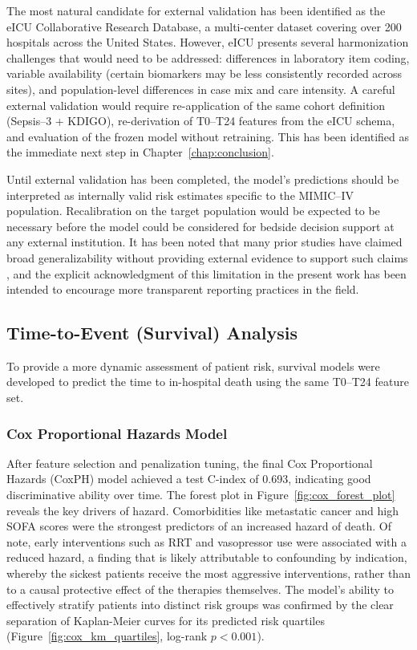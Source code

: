 The most natural candidate for external validation has been identified as the eICU Collaborative Research Database, a multi-center dataset covering over 200 hospitals across the United States. However, eICU presents several harmonization challenges that would need to be addressed: differences in laboratory item coding, variable availability (certain biomarkers may be less consistently recorded across sites), and population-level differences in case mix and care intensity. A careful external validation would require re-application of the same cohort definition (Sepsis--3 + KDIGO), re-derivation of T0--T24 features from the eICU schema, and evaluation of the frozen model without retraining. This has been identified as the immediate next step in Chapter~\ref{chap:conclusion}.

Until external validation has been completed, the model's predictions should be interpreted as internally valid risk estimates specific to the MIMIC--IV population. Recalibration on the target population would be expected to be necessary before the model could be considered for bedside decision support at any external institution. It has been noted that many prior studies have claimed broad generalizability without providing external evidence to support such claims \citep{Chen_2025}, and the explicit acknowledgment of this limitation in the present work has been intended to encourage more transparent reporting practices in the field.

\subsection{Time-to-Event (Survival) Analysis}
To provide a more dynamic assessment of patient risk, survival models were developed to predict the time to in-hospital death using the same T0--T24 feature set.

\subsubsection{Cox Proportional Hazards Model}
After feature selection and penalization tuning, the final Cox Proportional Hazards (CoxPH) model achieved a test C-index of 0.693, indicating good discriminative ability over time. The forest plot in Figure~\ref{fig:cox_forest_plot} reveals the key drivers of hazard. Comorbidities like metastatic cancer and high SOFA scores were the strongest predictors of an increased hazard of death. Of note, early interventions such as RRT and vasopressor use were associated with a reduced hazard, a finding that is likely attributable to confounding by indication, whereby the sickest patients receive the most aggressive interventions, rather than to a causal protective effect of the therapies themselves. The model's ability to effectively stratify patients into distinct risk groups was confirmed by the clear separation of Kaplan-Meier curves for its predicted risk quartiles (Figure~\ref{fig:cox_km_quartiles}, log-rank $p < 0.001$).

